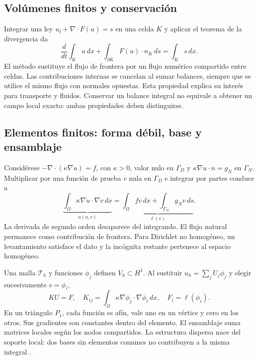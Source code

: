 \subsection{Volúmenes finitos y conservación}
Integrar una ley $u_t+\nabla\cdot F(u)=s$ en una celda $K$ y aplicar el teorema de la divergencia da
\begin{equation}
\frac{d}{dt}\int_Ku\,dx+\int_{\partial K}F(u)\cdot n_K\,ds=\int_Ks\,dx.
\end{equation}
El método sustituye el flujo de frontera por un flujo numérico compartido entre celdas. Las contribuciones internas se cancelan al sumar balances, siempre que se utilice el mismo flujo con normales opuestas. Esta propiedad explica su interés para transporte y fluidos. Conservar un balance integral no equivale a obtener un campo local exacto: ambas propiedades deben distinguirse.

\subsection{Elementos finitos: forma débil, base y ensamblaje}
Considérese $-\nabla\cdot(\kappa\nabla u)=f$, con $\kappa>0$, valor nulo en $\Gamma_D$ y $\kappa\nabla u\cdot n=g_N$ en $\Gamma_N$. Multiplicar por una función de prueba $v$ nula en $\Gamma_D$ e integrar por partes conduce a
\begin{equation}
\underbrace{\int_\Omega\kappa\nabla u\cdot\nabla v\,dx}_{a(u,v)}
=\underbrace{\int_\Omega fv\,dx+\int_{\Gamma_N}g_Nv\,ds}_{\ell(v)}.
\label{eq:fem-debil}
\end{equation}
La derivada de segundo orden desaparece del integrando. El flujo natural permanece como contribución de frontera. Para Dirichlet no homogéneo, un levantamiento satisface el dato y la incógnita restante pertenece al espacio homogéneo.

Una malla $\mathcal T_h$ y funciones $\phi_j$ definen $V_h\subset H^1$. Al sustituir $u_h=\sum_j U_j\phi_j$ y elegir sucesivamente $v=\phi_i$,
\begin{equation}
KU=F,\quad K_{ij}=\int_\Omega\kappa\nabla\phi_j\cdot\nabla\phi_i\,dx,
\quad F_i=\ell(\phi_i).
\label{eq:fem-sistema}
\end{equation}
En un triángulo $P_1$, cada función es afín, vale uno en un vértice y cero en los otros. Sus gradientes son constantes dentro del elemento. El ensamblaje suma matrices locales según los nodos compartidos. La estructura dispersa nace del soporte local: dos bases sin elementos comunes no contribuyen a la misma integral \cite{fenics2016}.

